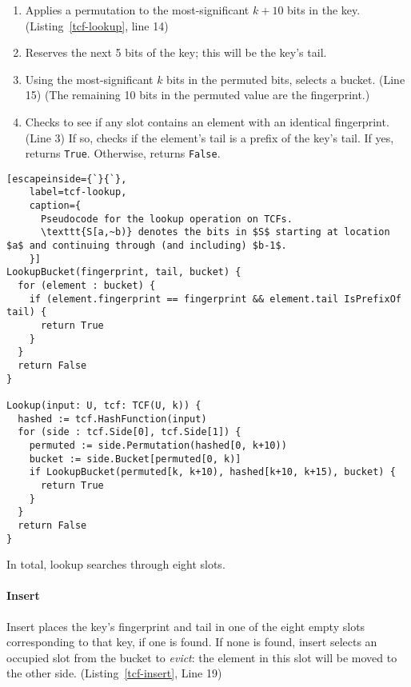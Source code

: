 \documentclass[letterpaper,twocolumn,10pt]{article}
\begin{document}
\begin{enumerate}
\item Applies a permutation to the most-significant $k+10$ bits in the key. (Listing~\ref{tcf-lookup}, line 14)
\item Reserves the next 5 bits of the key; this will be the key's tail.
\item Using the most-significant $k$ bits in the permuted bits, selects a bucket. (Line 15)
(The remaining 10 bits in the permuted value are the fingerprint.)
\item Checks to see if any slot contains an element with an identical fingerprint. (Line 3)
If so, checks if the element's tail is a prefix of the key's tail.
If yes, returns \verb|True|.
Otherwise, returns \verb|False|.
\end{enumerate}


\begin{figure*}
\begin{lstlisting}[escapeinside={`}{`},
    label=tcf-lookup,
    caption={
      Pseudocode for the lookup operation on TCFs.
      \texttt{S[a,~b)} denotes the bits in $S$ starting at location $a$ and continuing through (and including) $b-1$.
    }]
LookupBucket(fingerprint, tail, bucket) {
  for (element : bucket) {
    if (element.fingerprint == fingerprint && element.tail IsPrefixOf tail) {
      return True
    }
  }
  return False
}

Lookup(input: U, tcf: TCF(U, k)) {
  hashed := tcf.HashFunction(input)
  for (side : tcf.Side[0], tcf.Side[1]) {
    permuted := side.Permutation(hashed[0, k+10))
    bucket := side.Bucket[permuted[0, k)]
    if LookupBucket(permuted[k, k+10), hashed[k+10, k+15), bucket) {
      return True
    }
  }
  return False
}
\end{lstlisting}
\end{figure*}


In total, lookup searches through eight slots.

\paragraph{Insert}
Insert places the key's fingerprint and tail in one of the eight empty slots corresponding to that key, if one is found.
If none is found, insert selects an occupied slot from the bucket to {\em evict}: the element in this slot will be moved to the other side. (Listing~\ref{tcf-insert}, Line 19)
\end{document}
